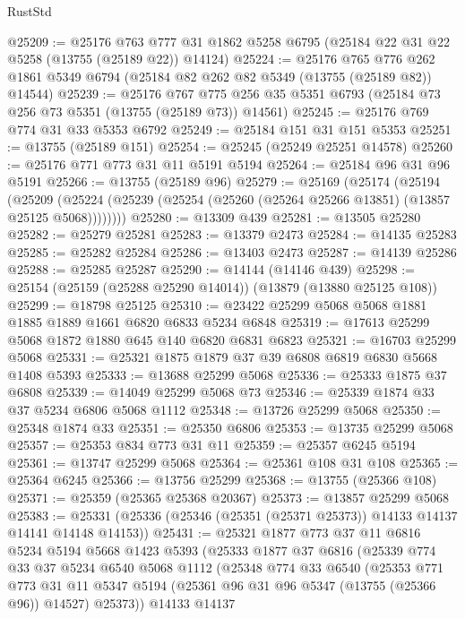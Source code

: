 \begin{lexlean}{RustStd}
\begin{coremodule}
@25209 := @25176
    @763
    @777
    @31
    @1862
    @5258
    @6795
    (@25184 @22 @31 @22 @5258 (@13755 (@25189 @22)) @14124)
@25224 := @25176
    @765
    @776
    @262
    @1861
    @5349
    @6794
    (@25184 @82 @262 @82 @5349 (@13755 (@25189 @82)) @14544)
@25239 := @25176
    @767
    @775
    @256
    @35
    @5351
    @6793
    (@25184 @73 @256 @73 @5351 (@13755 (@25189 @73)) @14561)
@25245 := @25176 @769 @774 @31 @33 @5353 @6792
@25249 := @25184 @151 @31 @151 @5353
@25251 := @13755 (@25189 @151)
@25254 := @25245 (@25249 @25251 @14578)
@25260 := @25176 @771 @773 @31 @11 @5191 @5194
@25264 := @25184 @96 @31 @96 @5191
@25266 := @13755 (@25189 @96)
@25279 := @25169
    (@25174
      (@25194
        (@25209 (@25224 (@25239 (@25254 (@25260 (@25264 @25266 @13851) (@13857 @25125 @5068))))))))
@25280 := @13309 @439
@25281 := @13505 @25280
@25282 := @25279 @25281
@25283 := @13379 @2473
@25284 := @14135 @25283
@25285 := @25282 @25284
@25286 := @13403 @2473
@25287 := @14139 @25286
@25288 := @25285 @25287
@25290 := @14144 (@14146 @439)
@25298 := @25154 (@25159 (@25288 @25290 @14014)) (@13879 (@13880 @25125 @108))
@25299 := @18798 @25125
@25310 := @23422 @25299 @5068 @5068 @1881 @1885 @1889 @1661 @6820 @6833 @5234 @6848
@25319 := @17613 @25299 @5068 @1872 @1880 @645 @140 @6820 @6831 @6823
@25321 := @16703 @25299 @5068
@25331 := @25321 @1875 @1879 @37 @39 @6808 @6819 @6830 @5668 @1408 @5393
@25333 := @13688 @25299 @5068
@25336 := @25333 @1875 @37 @6808
@25339 := @14049 @25299 @5068 @73
@25346 := @25339 @1874 @33 @37 @5234 @6806 @5068 @1112
@25348 := @13726 @25299 @5068
@25350 := @25348 @1874 @33
@25351 := @25350 @6806
@25353 := @13735 @25299 @5068
@25357 := @25353 @834 @773 @31 @11
@25359 := @25357 @6245 @5194
@25361 := @13747 @25299 @5068
@25364 := @25361 @108 @31 @108
@25365 := @25364 @6245
@25366 := @13756 @25299
@25368 := @13755 (@25366 @108)
@25371 := @25359 (@25365 @25368 @20367)
@25373 := @13857 @25299 @5068
@25383 := @25331 (@25336 (@25346 (@25351 (@25371 @25373)) @14133 @14137 @14141 @14148 @14153))
@25431 := @25321
    @1877
    @773
    @37
    @11
    @6816
    @5234
    @5194
    @5668
    @1423
    @5393
    (@25333
      @1877
      @37
      @6816
      (@25339
        @774
        @33
        @37
        @5234
        @6540
        @5068
        @1112
        (@25348
          @774
          @33
          @6540
          (@25353
            @771
            @773
            @31
            @11
            @5347
            @5194
            (@25361 @96 @31 @96 @5347 (@13755 (@25366 @96)) @14527)
            @25373))
        @14133
        @14137

\end{coremodule}
\end{lexlean}
